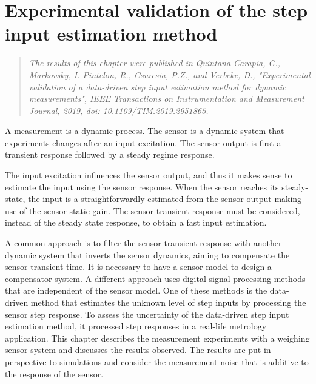 \glsresetall

\chapter{Experimental validation of the step input estimation method }\label{chap:ExperimentalValidation}


\begin{quote}
\vspace{-0.75cm}
\emph{The results of this chapter were published in Quintana Carapia, G., Markovsky, I. Pintelon, R., Csurcsia, P.Z., and Verbeke, D., "Experimental validation of a data-driven step input estimation method for dynamic measurements", IEEE Transactions on Instrumentation and Measurement Journal, 2019, doi: 10.1109/TIM.2019.2951865. \nocite{QuintanaTIM} }\vfill{}
\end{quote}



A measurement is a dynamic process. 
The sensor is a dynamic system that experiments changes after an input excitation.
The sensor output is first a transient response followed by a steady regime response.

The input excitation influences the sensor output, and thus it makes sense to estimate the input using the sensor response.
When the sensor reaches its steady-state, the input is a straightforwardly estimated from the sensor output making use of the sensor static gain.
The sensor transient response must be considered, instead of the steady state response, to obtain a fast input estimation.

A common approach is to filter the sensor transient response with another dynamic system that inverts the sensor dynamics, aiming to compensate the sensor transient time.
It is necessary to have a sensor model to design a compensator system. 
A different approach uses digital signal processing methods that are independent of the sensor model.
One of these methods is the data-driven method that estimates the unknown level of step inputs by processing the sensor step response. 
To assess the uncertainty of the data-driven step input estimation method, it processed step responses in a real-life metrology application. 
This chapter describes the measurement experiments with a weighing sensor system and discusses the results observed.
The results are put in perspective to simulations and consider the measurement noise that is additive to the response of the sensor. 

